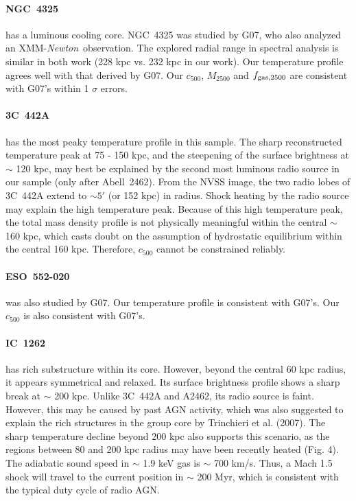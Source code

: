 \documentclass{aastex}
\def\xmm        {XMM-{\em Newton}\/}
\begin{document}
\begin{appendix}
\paragraph{NGC~4325} has a luminous cooling core. 
NGC~4325 was studied by G07, who also analyzed an \xmm\ observation.
The explored radial range in spectral analysis is similar in both work
(228 kpc vs. 232 kpc in our work).
Our temperature profile agrees well with that derived by G07. Our $c_{500}$,
$M_{2500}$ and $f_{\rm gas, 2500}$ are consistent with G07's within 1 $\sigma$ errors.

\paragraph{3C~442A} has the most peaky temperature profile in this sample.
The sharp
reconstructed temperature peak at 75 - 150 kpc, and the steepening of the
surface brightness at $\sim$ 120 kpc, may best be explained by the second
most luminous radio source in our sample (only after Abell~2462). From the
NVSS image, the two radio lobes of 3C~442A extend to $\sim 5'$ (or 152 kpc) in radius.
Shock heating by the radio source may explain the high temperature peak.
Because of this high temperature peak, the total mass density profile is not
physically meaningful within the central $\sim$160 kpc, which casts doubt on
the assumption of hydrostatic equilibrium within the central 160 kpc. Therefore,
$c_{500}$ cannot be constrained reliably.

\paragraph{ESO~552-020} was also studied by G07. Our temperature profile is
consistent with G07's. Our $c_{500}$ is also consistent with G07's.

\paragraph{IC~1262} has rich substructure within its core.
However, beyond the central 60 kpc radius, it appears symmetrical and relaxed.
Its surface brightness profile shows a sharp break at $\sim$ 200 kpc.
Unlike 3C~442A and A2462, its radio source is faint. However,
this may be caused by past AGN activity, which
was also suggested to explain the rich structures in the group core by
Trinchieri et al. (2007). The sharp temperature decline beyond 200 kpc
also supports this scenario, as the regions between 80 and 200 kpc radius
may have been recently heated (Fig. 4). The adiabatic sound speed in $\sim$ 1.9 keV gas
is $\sim$ 700 km/s. Thus, a Mach 1.5 shock will travel to the current position
in $\sim$ 200 Myr, which is consistent with the typical duty cycle of radio AGN.


\end{appendix}
\end{document}
